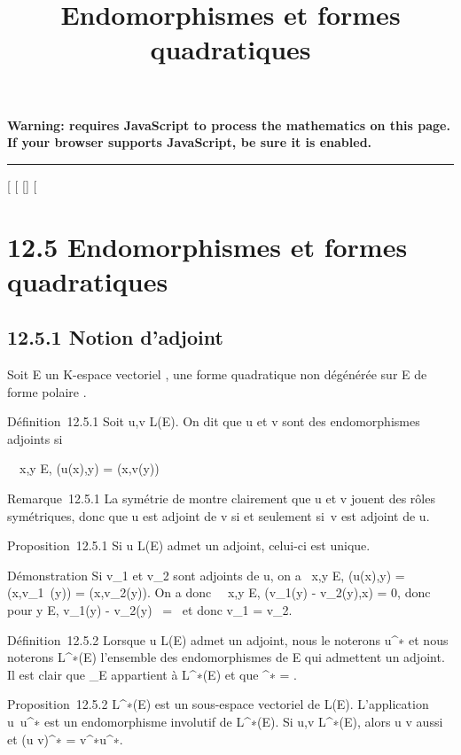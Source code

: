 \documentclass[]{article}
\title{Endomorphismes et formes quadratiques}
\author{}
\date{}
\begin{document}
\maketitle

\textbf{Warning: 
requires JavaScript to process the mathematics on this page.\\ If your
browser supports JavaScript, be sure it is enabled.}

\begin{center}\rule{3in}{0.4pt}\end{center}

[
[
[]
[

\section{12.5 Endomorphismes et formes quadratiques}

\subsection{12.5.1 Notion d'adjoint}

Soit E un K-espace vectoriel , \Phi une forme quadratique non dégénérée sur
E de forme polaire \phi.

Définition~12.5.1 Soit u,v \in L(E). On dit que u et v sont des
endomorphismes adjoints si

\forall~~x,y \in E, \phi(u(x),y) = \phi(x,v(y))

Remarque~12.5.1 La symétrie de \phi montre clairement que u et v jouent des
rôles symétriques, donc que u est adjoint de v si et seulement si~v est
adjoint de u.

Proposition~12.5.1 Si u \in L(E) admet un adjoint, celui-ci est unique.

Démonstration Si v_1 et v_2 sont adjoints de u, on a
\forall~x,y \in E, \phi(u(x),y) = \phi(x,v_1~(y)) =
\phi(x,v_2(y)). On a donc \forall~~x,y \in E,
\phi(v_1(y) - v_2(y),x) = 0, donc pour y \in E,
v_1(y) - v_2(y)
\in\mathrmKer~\phi =
\0\ et donc v_1 =
v_2.

Définition~12.5.2 Lorsque u \in L(E) admet un adjoint, nous le noterons
u^∗ et nous noterons L^∗(E) l'ensemble des
endomorphismes de E qui admettent un adjoint. Il est clair que
\mathrmId_E appartient à L^∗(E)
et que \mathrmId^∗ =
\mathrmId.

Proposition~12.5.2 L^∗(E) est un sous-espace vectoriel de
L(E). L'application u\mapsto~u^∗ est un
endomorphisme involutif de L^∗(E). Si u,v \in
L^∗(E), alors u \cdot v aussi et (u \cdot v)^∗ =
v^∗\cdot u^∗.
\end{document}
